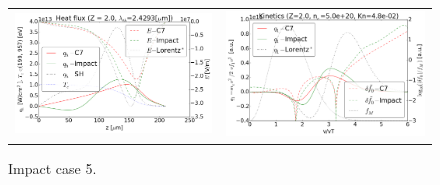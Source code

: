 \begin{figure}[tbh]
  \begin{center}
    \begin{tabular}{cc}
      \includegraphics[width=\figscale\textwidth]{../VFPdata/C7_Impact_case5_heatflux.png} &
      \includegraphics[width=\figscale\textwidth]{../VFPdata/C7_Impact_case5_kinetics.png}
    \end{tabular}
  \caption{  
  Impact case 5.}
  \end{center}
  \label{fig:C7_Impact_case1}
\end{figure}
\clearpage
